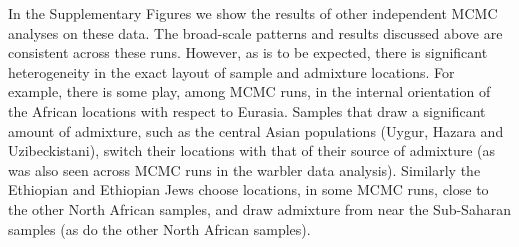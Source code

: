 \documentclass[12pt]{article}
\newcommand{\gb}[1]{{\it\color{magenta}{(#1)}}}
\begin{document}
In the Supplementary Figures \gb{XXXX-ZZZZZ} we show the results of other independent MCMC analyses on these data. The broad-scale patterns and results discussed above are consistent across these runs. However, as is to be expected, there is significant heterogeneity in the exact layout of sample and admixture locations. For example, there is some play, among MCMC runs, in the internal orientation of the African locations with respect to Eurasia.  Samples that draw a significant amount of admixture, such as the central Asian populations (Uygur, Hazara and Uzibeckistani), switch their locations with that of their source of admixture (as was also seen across MCMC runs in the warbler data analysis). Similarly the Ethiopian and Ethiopian Jews choose locations, in some MCMC runs, close to the other North African samples, and draw admixture from near the Sub-Saharan samples (as do the other North African samples).
\end{document}
